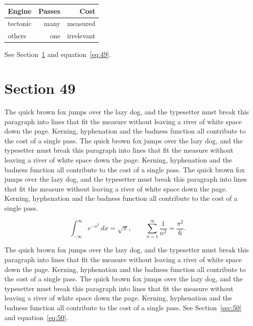 \documentclass{article}
\begin{document}
\begin{center}
\begin{tabular}{lrr}
\toprule
Engine & Passes & Cost \\
\midrule
tectonic & many & measured \\
others & one & irrelevant \\
\bottomrule
\end{tabular}
\end{center}

See Section~\ref{sec:49} and equation~\eqref{eq:49}.
\section{Section 49}
\label{sec:49}
The quick brown fox jumps over the lazy dog, and the typesetter must break this paragraph into lines that fit the measure without leaving a river of white space down the page. Kerning, hyphenation and the badness function all contribute to the cost of a single pass. The quick brown fox jumps over the lazy dog, and the typesetter must break this paragraph into lines that fit the measure without leaving a river of white space down the page. Kerning, hyphenation and the badness function all contribute to the cost of a single pass. The quick brown fox jumps over the lazy dog, and the typesetter must break this paragraph into lines that fit the measure without leaving a river of white space down the page. Kerning, hyphenation and the badness function all contribute to the cost of a single pass. 

\begin{equation}\label{eq:49}
\int_{-\infty}^{\infty} e^{-x^{2}}\,dx = \sqrt{\pi}, \qquad
\sum_{n=1}^{\infty} \frac{1}{n^{2}} = \frac{\pi^{2}}{6}.
\end{equation}

The quick brown fox jumps over the lazy dog, and the typesetter must break this paragraph into lines that fit the measure without leaving a river of white space down the page. Kerning, hyphenation and the badness function all contribute to the cost of a single pass. The quick brown fox jumps over the lazy dog, and the typesetter must break this paragraph into lines that fit the measure without leaving a river of white space down the page. Kerning, hyphenation and the badness function all contribute to the cost of a single pass. 
See Section~\ref{sec:50} and equation~\eqref{eq:50}.
\end{document}
